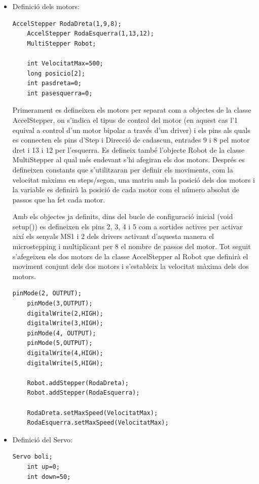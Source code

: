 \begin{itemize}
	\item Definició dels motors: 
	
	\begin{lstlisting}[style=Arduino]
	AccelStepper RodaDreta(1,9,8);
	AccelStepper RodaEsquerra(1,13,12);
	MultiStepper Robot;
	
	int VelocitatMax=500;
	long posicio[2];
	int pasdreta=0; 
	int pasesquerra=0;
	\end{lstlisting}
	
	
	Primerament es defineixen els motors per separat com a objectes de la classe AccelStepper, on s’indica el tipus de control del motor (en aquest cas l’1 equival a control d’un motor bipolar a través d’un driver) i els pins als quals es connecten els pins d’Step i Direcció de cadascun, entrades 9 i 8 pel motor dret i 13 i 12 per l’esquerra. Es defineix també l’objecte Robot de la classe MultiStepper al qual més endevant s’hi afegiran els dos motors. Després es defineixen constants que s’utilitzaran per definir els moviments, com la velocitat màxima en steps/segon, una matriu amb la posició dels dos motors i la variable es definirà la posició de cada motor com el número absolut de passos que ha fet cada motor. 
	
	Amb els objectes ja definits, dins del bucle de configuració inicial (void setup()) es defineixen els pins 2, 3, 4 i 5 com a sortides actives per activar així els senyals MS1 i 2 dels drivers activant d’aquesta manera el microstepping i multiplicant per 8 el nombre de passos del motor. Tot seguit s’afegeixen els dos motors de la classe AccelStepper al Robot que definirà el moviment conjunt dels dos motors i s’estableix la velocitat màxima dels dos motors. 
	
	\begin{lstlisting}[style=Arduino]
	pinMode(2, OUTPUT); 
	pinMode(3,OUTPUT);
	digitalWrite(2,HIGH);
	digitalWrite(3,HIGH);
	pinMode(4, OUTPUT);
	pinMode(5,OUTPUT);
	digitalWrite(4,HIGH);
	digitalWrite(5,HIGH);
	
	Robot.addStepper(RodaDreta);
	Robot.addStepper(RodaEsquerra);
	
	RodaDreta.setMaxSpeed(VelocitatMax);	
	RodaEsquerra.setMaxSpeed(VelocitatMax);
	\end{lstlisting}	
	\item Definició del Servo:
	\begin{lstlisting}[style=Arduino]
	Servo boli;
	int up=0;
	int down=50;
	\end{lstlisting}
	

\end{itemize}

